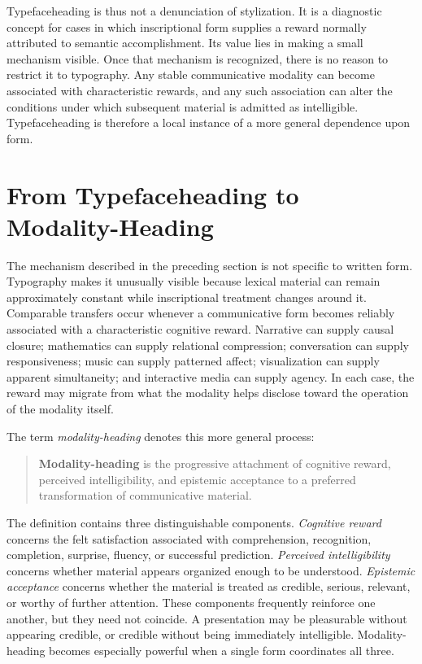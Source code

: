 \documentclass[11pt]{article}
\newcommand{\term}[1]{\emph{#1}}
\begin{document}
Typefaceheading is thus not a denunciation of stylization. It is a diagnostic
concept for cases in which inscriptional form supplies a reward normally
attributed to semantic accomplishment. Its value lies in making a small
mechanism visible. Once that mechanism is recognized, there is no reason to
restrict it to typography. Any stable communicative modality can become
associated with characteristic rewards, and any such association can alter
the conditions under which subsequent material is admitted as intelligible.
Typefaceheading is therefore a local instance of a more general dependence
upon form.

\section{From Typefaceheading to Modality-Heading}

The mechanism described in the preceding section is not specific to written
form. Typography makes it unusually visible because lexical material can
remain approximately constant while inscriptional treatment changes around
it. Comparable transfers occur whenever a communicative form becomes
reliably associated with a characteristic cognitive reward. Narrative can
supply causal closure; mathematics can supply relational compression;
conversation can supply responsiveness; music can supply patterned affect;
visualization can supply apparent simultaneity; and interactive media can
supply agency. In each case, the reward may migrate from what the modality
helps disclose toward the operation of the modality itself.

The term \term{modality-heading} denotes this more general process:

\begin{quote}
\textbf{Modality-heading} is the progressive attachment of cognitive reward,
perceived intelligibility, and epistemic acceptance to a preferred
transformation of communicative material.
\end{quote}

The definition contains three distinguishable components. \term{Cognitive
reward} concerns the felt satisfaction associated with comprehension,
recognition, completion, surprise, fluency, or successful prediction.
\term{Perceived intelligibility} concerns whether material appears organized
enough to be understood. \term{Epistemic acceptance} concerns whether the
material is treated as credible, serious, relevant, or worthy of further
attention. These components frequently reinforce one another, but they need
not coincide. A presentation may be pleasurable without appearing credible,
or credible without being immediately intelligible. Modality-heading becomes
especially powerful when a single form coordinates all three.
\end{document}
